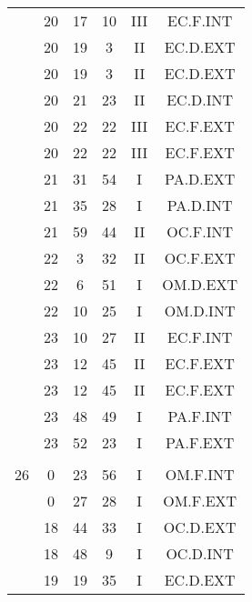 \documentclass[12pt, a4paper]{article}
\begin{document}
\begin{multicols}{3}
{\begin{tabular}{c c c c c c}
	 	 	 	 & 20 & 17 & 10 & III & EC.F.INT\\%
	 	 	 	 & 20 & 19 & 3 & II & EC.D.EXT\\%
	 	 	 	 & 20 & 19 & 3 & II & EC.D.EXT\\%
	 	 	 	 & 20 & 21 & 23 & II & EC.D.INT\\%
	 	 	 	 & 20 & 22 & 22 & III & EC.F.EXT\\%
	 	 	 	 & 20 & 22 & 22 & III & EC.F.EXT\\%
	 	 	 	 & 21 & 31 & 54 & I & PA.D.EXT\\%
	 	 	 	 & 21 & 35 & 28 & I & PA.D.INT\\%
	 	 	 	 & 21 & 59 & 44 & II & OC.F.INT\\%
	 	 	 	 & 22 & 3 & 32 & II & OC.F.EXT\\%
	 	 	 	 & 22 & 6 & 51 & I & OM.D.EXT\\%
	 	 	 	 & 22 & 10 & 25 & I & OM.D.INT\\%
	 	 	 	 & 23 & 10 & 27 & II & EC.F.INT\\%
	 	 	 	 & 23 & 12 & 45 & II & EC.F.EXT\\%
	 	 	 	 & 23 & 12 & 45 & II & EC.F.EXT\\%
	 	 	 	 & 23 & 48 & 49 & I & PA.F.INT\\%
	 	 	 	 & 23 & 52 & 23 & I & PA.F.EXT\\%
	 	 	 	 & & & & & \\%
	 	 	 	26 & 0 & 23 & 56 & I & OM.F.INT\\%
	 	 	 	 & 0 & 27 & 28 & I & OM.F.EXT\\%
	 	 	 	 & 18 & 44 & 33 & I & OC.D.EXT\\%
	 	 	 	 & 18 & 48 & 9 & I & OC.D.INT\\%
	 	 	 	 & 19 & 19 & 35 & I & EC.D.EXT\\%

\end{tabular}}
\end{multicols}
\end{document}
